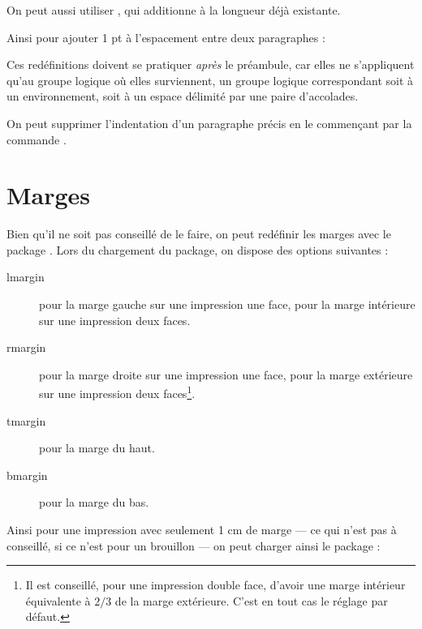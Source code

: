 \begin{latexcode}
\setlength{\parindent}{3ex}
\end{latexcode}

On peut aussi utiliser , qui additionne  à la longueur déjà existante.

Ainsi pour ajouter 1 pt à l'espacement entre deux paragraphes :

\begin{latexcode}
\addtolength{\parskip}{1pt}
\end{latexcode}

Ces redéfinitions doivent se pratiquer \emph{après} le préambule, car elles ne s'appliquent qu'au groupe logique où elles surviennent, un groupe logique correspondant soit à un environnement, soit à un espace délimité par une paire d'accolades.

\begin{plusloins}
On peut supprimer l'indentation d'un paragraphe précis en le commençant par la commande .
\end{plusloins}

\section{Marges}

Bien qu'il ne soit pas conseillé de le faire, on peut redéfinir les marges avec le package . Lors du chargement du package, on dispose des options suivantes :
\begin{description}
\item[lmargin]pour la marge gauche sur une impression une face, pour la marge intérieure sur une impression deux faces.
\item[rmargin]pour la marge droite sur une impression une face, pour la marge extérieure sur une impression deux faces\footnote{Il est conseillé, pour une impression double face, d'avoir une marge intérieur équivalente à $2/3$ de la marge extérieure. C'est en tout cas le réglage par défaut.}.
\item[tmargin]pour la marge du haut.
\item[bmargin]pour la marge du bas.
\end{description}

Ainsi pour une impression avec seulement 1 cm de marge --- ce qui n'est pas à conseillé, si ce n'est pour un brouillon --- on peut charger ainsi le package :

\begin{latexcode}
\usepackage[lmargin=1cm,rmargin=1cm,tmargin=1cm,bmargin=1cm]{geometry}
\end{latexcode}


